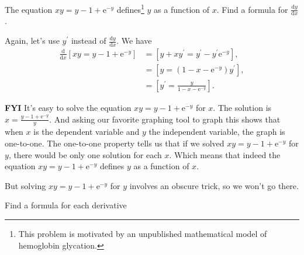 \documentclass[12pt,fleqn,answers]{exam}
\begin{document}
\begin{questions}
    \question [1] The equation $x y = y - 1 + \mathrm{e}^{-y} $ defines\footnote{This problem is motivated by an unpublished mathematical model of hemoglobin glycation.}
    $y$ as a function of $x$.  Find a formula for $\displaystyle \frac{\mathrm{d} y}{\mathrm{d} x}$.
    
    \begin{solution}[2.5in]
    Again, let's use $y^\prime$ instead of $\displaystyle \frac{\mathrm{d}y}{\mathrm{d}x}$. We have
    \begin{align*}
      \frac{\mathrm{d}}{\mathrm{d} x} \left [ x y = y - 1 + \mathrm{e}^{-y} \right] &= \left[ y + x y^\prime = y^\prime - y^\prime \mathrm{e}^{-y} \right], \\
      &= \left[ y  =  (1-x  - \mathrm{e}^{-y}) y^\prime  \right], \\
      &= \left[ y^\prime = \frac{y}{1-x - \mathrm{e}^{-y}} \right].
    \end{align*}

    \textbf{FYI} It's easy to solve the equation $x y = y - 1 + \mathrm{e}^{-y} $
    for $x$. The solution is $x = \frac{y-1 +  \mathrm{e}^{-y}}{y}$. 
    And asking our favorite graphing tool to graph this shows that
    when $x$ is the dependent variable and $y$ the independent variable,
    the graph is one-to-one.  The one-to-one property tells us that
    if we solved $x y = y - 1 + \mathrm{e}^{-y} $ for $y$, there would be
    only one solution for each $x$. Which means that indeed the
    equation $x y = y - 1 + \mathrm{e}^{-y} $ defines $y$ as
    a function of $x$.

    But solving $x y = y - 1 + \mathrm{e}^{-y} $ for $y$ involves
    an obscure trick, so we won't go there.
    
    \end{solution}


    \question Find a formula for each derivative
\end{questions}
\end{document}

